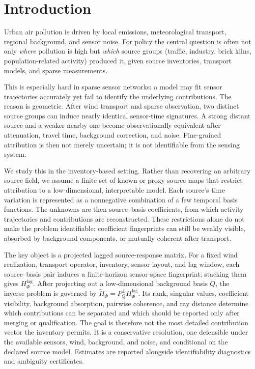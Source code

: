 \section{Introduction}
\label{sec:introduction}

Urban air pollution is driven by local emissions, meteorological transport,
regional background, and sensor noise.  For policy the central question is often
not only \emph{where} pollution is high but \emph{which} source groups (traffic,
industry, brick kilns, population-related activity) produced it, given source
inventories, transport models, and sparse measurements.

This is especially hard in sparse sensor networks: a model may fit sensor
trajectories accurately yet fail to identify the underlying contributions.  The
reason is geometric.  After wind transport and sparse observation, two distinct
source groups can induce nearly identical sensor-time signatures.  A strong
distant source and a weaker nearby one become observationally equivalent after
attenuation, travel time, background correction, and noise.
Fine-grained attribution is then not merely uncertain; it is not identifiable
from the sensing system.

We study this in the inventory-based setting.  Rather than recovering an arbitrary
source field, we assume a finite set of known or proxy source maps that restrict
attribution to a low-dimensional, interpretable model.  Each source's
time variation is represented as a nonnegative combination of a few temporal basis
functions.  The unknowns are then source--basis coefficients, from which activity
trajectories and contributions are reconstructed.  These restrictions alone do not
make the problem identifiable: coefficient fingerprints can still be weakly
visible, absorbed by background components, or mutually coherent after transport.

The key object is a projected lagged source-response matrix.  For a fixed wind
realization, transport operator, inventory, sensor layout, and lag window, each
source--basis pair induces a finite-horizon sensor-space fingerprint; stacking
them gives \(H_{\Phi}^{\mathrm{lag}}\).  After projecting out a low-dimensional
background basis \(Q\), the inverse problem is governed by
\(\widetilde H_\Phi = P_Q^\perp H_{\Phi}^{\mathrm{lag}}\).  Its rank, singular
values, coefficient visibility, background absorption, pairwise coherence, and ray
distance determine which contributions can be separated and which should be
reported only after merging or qualification.  The goal is therefore not the most
detailed contribution vector the inventory permits.  It is a conservative
resolution, one defensible under the available sensors, wind, background, and
noise, and conditional on the declared source model.  Estimates are reported
alongside identifiability diagnostics and ambiguity certificates.


